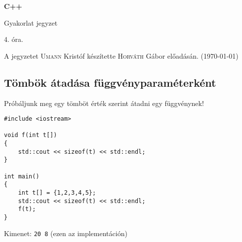 \documentclass[a4paper,11.5pt,table]{article}
\begin{document}
	\setlength\parindent{0pt}
	\def\<{<\hspace{0mm}<}
	
	\theoremstyle{definition}
	\newtheorem{note}{Megjegyzés}[subsection]
	
	\begin{center}
		{\LARGE\textbf{C++}}
		
		{\Large Gyakorlat jegyzet}
		
		4. óra.
	\end{center}
	A jegyzetet \textsc{Umann} Kristóf készítette \textsc{Horváth} Gábor  előadásán. (\today)
	
	\subsection{Tömbök átadása függvényparaméterként}
	Próbáljunk meg egy tömböt érték szerint átadni egy függvénynek!
	\begin{lstlisting}
#include <iostream>

void f(int t[])
{
	std::cout << sizeof(t) << std::endl;
}

int main()
{
	int t[] = {1,2,3,4,5};
	std::cout << sizeof(t) << std::endl;
	f(t);
}
	\end{lstlisting}
	Kimenet: \texttt{20 8} (ezen az implementáción)
	
\end{document}
